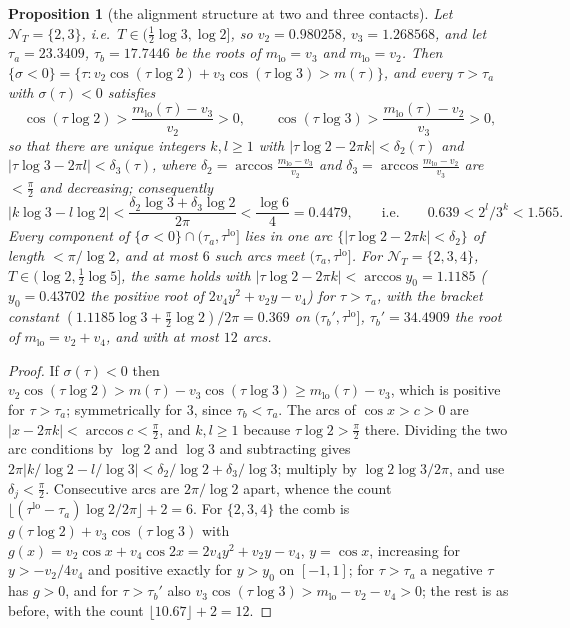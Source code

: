 \documentclass[11pt]{amsart}
\newtheorem{proposition}[theorem]{Proposition}
\theoremstyle{definition}
\theoremstyle{remark}
\newcommand{\NT}{\mathcal N_T}
\begin{document}
\begin{proposition}[the alignment structure at two and three contacts]\label{prop:align}
Let $\NT=\{2,3\}$, i.e.\ $T\in(\frac12\log3,\log2]$, so $v_2=0.980258$, $v_3=1.268568$, and let $\tau_a=23.3409$,
$\tau_b=17.7446$ be the roots of $m_{\mathrm{lo}}=v_3$ and $m_{\mathrm{lo}}=v_2$. Then
$\{\sigma<0\}=\{\tau:v_2\cos(\tau\log2)+v_3\cos(\tau\log3)>m(\tau)\}$, and every $\tau>\tau_a$ with
$\sigma(\tau)<0$ satisfies
\[
\cos(\tau\log2)>\frac{m_{\mathrm{lo}}(\tau)-v_3}{v_2}>0,\qquad\cos(\tau\log3)>\frac{m_{\mathrm{lo}}(\tau)-v_2}{v_3}>0,
\]
so that there are unique integers $k,l\ge1$ with $|\tau\log2-2\pi k|<\delta_2(\tau)$ and
$|\tau\log3-2\pi l|<\delta_3(\tau)$, where $\delta_2=\arccos\frac{m_{\mathrm{lo}}-v_3}{v_2}$ and
$\delta_3=\arccos\frac{m_{\mathrm{lo}}-v_2}{v_3}$ are $<\frac\pi2$ and decreasing; consequently
\[
|k\log3-l\log2|<\frac{\delta_2\log3+\delta_3\log2}{2\pi}<\frac{\log6}4=0.4479,\qquad\text{i.e.}\qquad
0.639<2^l/3^k<1.565 .
\]
Every component of $\{\sigma<0\}\cap(\tau_a,\tau^{\mathrm{lo}}]$ lies in one arc $\{|\tau\log2-2\pi k|<\delta_2\}$ of
length $<\pi/\log2$, and at most $6$ such arcs meet $(\tau_a,\tau^{\mathrm{lo}}]$. For $\NT=\{2,3,4\}$,
$T\in(\log2,\frac12\log5]$, the same holds with $|\tau\log2-2\pi k|<\arccos y_0=1.1185$ ($y_0=0.43702$ the
positive root of $2v_4y^2+v_2y-v_4$) for $\tau>\tau_a$, with the bracket constant
$(1.1185\log3+\frac\pi2\log2)/2\pi=0.369$ on $(\tau_b',\tau^{\mathrm{lo}}]$, $\tau_b'=34.4909$ the root of
$m_{\mathrm{lo}}=v_2+v_4$, and with at most $12$ arcs.
\end{proposition}
\begin{proof}
If $\sigma(\tau)<0$ then $v_2\cos(\tau\log2)>m(\tau)-v_3\cos(\tau\log3)\ge m_{\mathrm{lo}}(\tau)-v_3$, which is
positive for $\tau>\tau_a$; symmetrically for $3$, since $\tau_b<\tau_a$. The arcs of $\cos x>c>0$ are
$|x-2\pi k|<\arccos c<\frac\pi2$, and $k,l\ge1$ because $\tau\log2>\frac\pi2$ there. Dividing the two arc
conditions by $\log2$ and $\log3$ and subtracting gives $2\pi|k/\log2-l/\log3|<\delta_2/\log2+\delta_3/\log3$;
multiply by $\log2\log3/2\pi$, and use $\delta_j<\frac\pi2$. Consecutive arcs are $2\pi/\log2$ apart, whence
the count $\lfloor(\tau^{\mathrm{lo}}-\tau_a)\log2/2\pi\rfloor+2=6$. For $\{2,3,4\}$ the comb is
$g(\tau\log2)+v_3\cos(\tau\log3)$ with $g(x)=v_2\cos x+v_4\cos2x=2v_4y^2+v_2y-v_4$, $y=\cos x$, increasing for
$y>-v_2/4v_4$ and positive exactly for $y>y_0$ on $[-1,1]$; for $\tau>\tau_a$ a negative $\tau$ has $g>0$, and
for $\tau>\tau_b'$ also $v_3\cos(\tau\log3)>m_{\mathrm{lo}}-v_2-v_4>0$; the rest is as before, with the count
$\lfloor10.67\rfloor+2=12$.
\end{proof}
\end{document}
